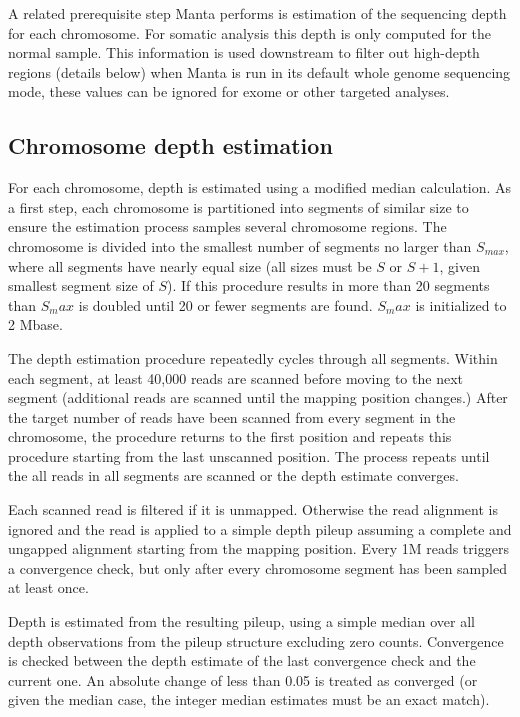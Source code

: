 \documentclass{article}
\begin{document}
A related prerequisite step Manta performs is estimation of the sequencing depth for each chromosome. For somatic analysis this depth is only computed for the normal sample. This information is used downstream to filter out high-depth regions (details below) when Manta is run in its default whole genome sequencing mode, these values can be ignored for exome or other targeted analyses.

\subsection{Chromosome depth estimation}

For each chromosome, depth is estimated using a modified median calculation. As a first step, each chromosome is partitioned into segments of similar size to ensure the estimation process samples several chromosome regions. The chromosome is divided into the smallest number of segments no larger than $S_{max}$, where all segments have nearly equal size (all sizes must be $S$ or $S+1$, given smallest segment size of $S$). If this procedure results in more than 20 segments than $S_max$ is doubled until 20 or fewer segments are found. $S_max$ is initialized to 2 Mbase.

The depth estimation procedure repeatedly cycles through all segments. Within each segment, at least 40,000 reads are scanned before moving to the next segment (additional reads are scanned until the mapping position changes.) After the target number of reads have been scanned from every segment in the chromosome, the procedure returns to the first position and repeats this procedure starting from the last unscanned position. The process repeats until the all reads in all segments are scanned or the depth estimate converges.

Each scanned read is filtered if it is unmapped. Otherwise the read alignment is ignored and the read is applied to a simple depth pileup assuming a complete and ungapped alignment starting from the mapping position. Every 1M reads triggers a convergence check, but only after every chromosome segment has been sampled at least once.

Depth is estimated from the resulting pileup, using a simple median over all depth observations from the pileup structure excluding zero counts. Convergence is checked between the depth estimate of the last convergence check and the current one. An absolute change of less than 0.05 is treated as converged (or given the median case, the integer median estimates must be an exact match).
\end{document}

